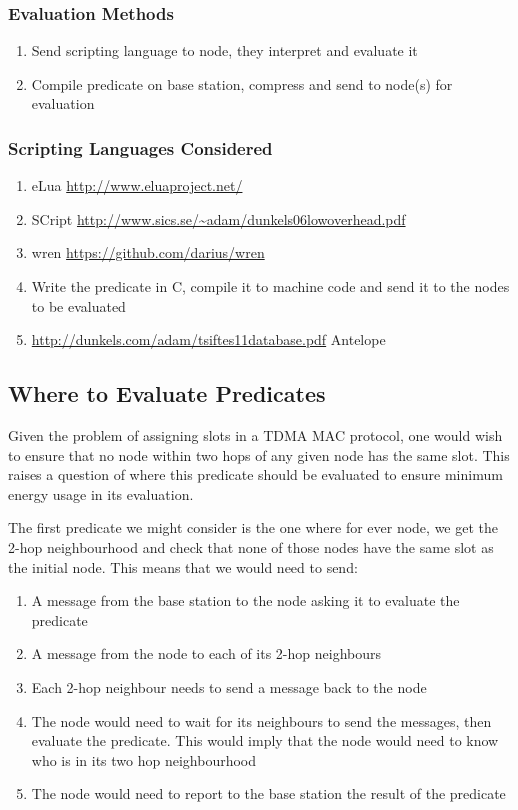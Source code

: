\subsubsection{Evaluation Methods}

\begin{enumerate}
	\item Send scripting language to node, they interpret and evaluate it
	\item Compile predicate on base station, compress and send to node(s) for evaluation
\end{enumerate}

\subsubsection{Scripting Languages Considered}

\begin{enumerate}
	\item eLua \url{http://www.eluaproject.net/} \cite{elua}
	\item SCript \url{http://www.sics.se/~adam/dunkels06lowoverhead.pdf} \cite{dunkels06lowoverhead}
	\item wren \url{https://github.com/darius/wren} \cite{wren}
	\item Write the predicate in C, compile it to machine code and send it to the nodes to be evaluated
	\item \url{http://dunkels.com/adam/tsiftes11database.pdf} Antelope
\end{enumerate}


\subsection{Where to Evaluate Predicates}

Given the problem of assigning slots in a TDMA MAC protocol, one would wish to ensure that no node within two hops of any given node has the same slot. This raises a question of where this predicate should be evaluated to ensure minimum energy usage in its evaluation.

The first predicate we might consider is the one where for ever node, we get the 2-hop neighbourhood and check that none of those nodes have the same slot as the initial node. This means that we would need to send:
\begin{enumerate}
	\item A message from the base station to the node asking it to evaluate the predicate
	\item A message from the node to each of its 2-hop neighbours
	\item Each 2-hop neighbour needs to send a message back to the node
	\item The node would need to wait for its neighbours to send the messages, then evaluate the predicate. This would imply that the node would need to know who is in its two hop neighbourhood
	\item The node would need to report to the base station the result of the predicate
\end{enumerate}

